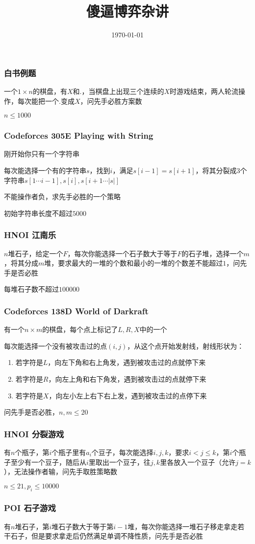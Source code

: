\documentclass[CJK]{beamer}
\begin{document}
\title{傻逼博弈杂讲}
\date{\today}
\begin{frame}
\titlepage
\end{frame}
\begin{frame}
\frametitle{白书例题}
一个$1 \times n$的棋盘，有$X$和$.$，当棋盘上出现三个连续的$X$时游戏结束，两人轮流操作，每次能把一个$.$变成$X$，问先手必胜方案数

$n \le 1000$
\end{frame}
\begin{frame}
\frametitle{Codeforces 305E Playing with String}
刚开始你只有一个字符串

每次能选择一个有的字符串$s$，找到$i$，满足$s[i-1]=s[i+1]$，将其分裂成$3$个字符串$s[1 \cdots i-1],s[i],s[i+1 \cdots |s|]$

不能操作者负，求先手必胜的一个策略

初始字符串长度不超过$5000$
\end{frame}
\begin{frame}
\frametitle{HNOI 江南乐}
$n$堆石子，给定一个$F$，每次你能选择一个石子数大于等于$F$的石子堆，选择一个$m$，将其分成$m$堆，要求最大的一堆的个数和最小的一堆的个数差不能超过$1$，问先手是否必胜

每堆石子数不超过$100000$
\end{frame}
\begin{frame}
\frametitle{Codeforces 138D World of Darkraft}
有一个$n \times m$的棋盘，每个点上标记了$L,R,X$中的一个

每次能选择一个没有被攻击过的点$(i,j)$，从这个点开始发射线，射线形状为：

\begin{enumerate}
\item 若字符是$L$，向左下角和右上角发，遇到被攻击过的点就停下来
\item 若字符是$R$，向左上角和右下角发，遇到被攻击过的点就停下来
\item 若字符是$X$，向左小左上右下右上发，遇到被攻击过的点停下来
\end{enumerate}

问先手是否必胜，$n,m \le 20$
\end{frame}
\begin{frame}
\frametitle{HNOI 分裂游戏}
有$n$个瓶子，第$i$个瓶子里有$a_i$个豆子，每次能选择$i,j,k$，要求$i<j \le k$，第$i$个瓶子至少有一个豆子，随后从$i$里取出一个豆子，往$j,k$里各放入一个豆子（允许$j=k$），无法操作者输，问先手取胜策略数

$n \le 21,p_i \le 10000$
\end{frame}
\begin{frame}
\frametitle{POI 石子游戏}
有$n$堆石子，第$i$堆石子数大于等于第$i-1$堆，每次你能选择一堆石子移走拿走若干石子，但是要求拿走后仍然满足单调不降性质，问先手是否必胜
\end{frame}
\end{document}
